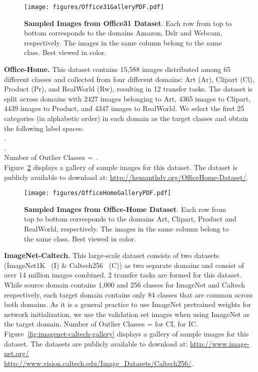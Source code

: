 \documentclass[10pt,twocolumn,letterpaper]{article}
\begin{document}
\begin{figure}[!htbp]
	\begin{center}
	\texttt{[image: figures/Office31GalleryPDF.pdf]}
	\end{center}
	\vskip -0.15in
	\caption{\small \textbf{Sampled Images from Office31 Dataset}. Each row from top to bottom corresponds to the domains Amazon, Dslr and Webcam, respectively. The images in the same column belong to the same class. Best viewed in color.}
	\label{fig:office-31-gallery}
 	\vskip -0.1in
\end{figure} 
\vspace{2mm}
\noindent \textbf{Office-Home.} This dataset contains 15,588 images distributed among 65 different classes and collected from four different domains: Art (Ar), Clipart (Cl), Product (Pr), and RealWorld (Rw), resulting in 12 transfer tasks. The dataset is split across domains with 2427 images belonging to Art, 4365 images to Clipart, 4439 images to Product, and 4347 images to RealWorld. We select the first 25 categories (in alphabetic order) in each domain as the target classes and obtain the following label spaces:\\
.\\
.\\
Number of Outlier Classes = .\\
Figure~\ref{fig:office-home-gallery} displays a gallery of sample images for this dataset. The dataset is publicly available to download at: \url{http://hemanthdv.org/OfficeHome-Dataset/}. \\

\begin{figure}[!htbp]
	\begin{center}
	\texttt{[image: figures/OfficeHomeGalleryPDF.pdf]}
	\end{center}
	\vskip -0.15in
	\caption{\small \textbf{Sampled Images from Office-Home Dataset}.
	Each row from top to bottom corresponds to the domains Art, Clipart, Product and RealWorld, respectively. The images in the same column belong to the same class. Best viewed in color.}
	\label{fig:office-home-gallery}
 	\vskip -0.1in
\end{figure} 
\vspace{2mm}
\noindent
\textbf{ImageNet-Caltech.} This large-scale dataset consists of two datasets (ImageNet1K~\cite{russakovsky2015imagenet} (I) \& Caltech256~\cite{griffin2007caltech} (C)) as two separate domains and consist of over 14 million images combined. 2 transfer tasks are formed for this dataset. While source domain contains 1,000 and 256 classes for ImageNet and Caltech respectively, each target domain contains only 84 classes that are common across both domains. As it is a general practice to use ImageNet pretrained weights for network initialization, we use the validation set images when using ImageNet as the target domain.
\noindent
Number of Outlier Classes =  for CI,  for IC.
Figure~\ref{fig:imagenet-caltech-gallery} displays a gallery of sample images for this dataset. The datasets are publicly available to download at: \url{http://www.image-net.org/} \\ \url{http://www.vision.caltech.edu/Image_Datasets/Caltech256/}.
\end{document}
